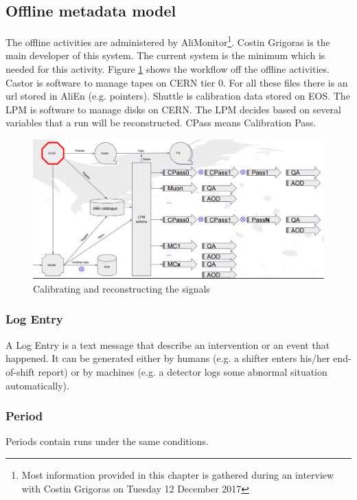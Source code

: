 \subsection{Offline metadata model}
The offline activities are administered by AliMonitor\footnote{Most information provided in this chapter is gathered during an interview with Costin Grigoras on Tuesday 12 December 2017}. Costin Grigoras is the main developer of this system. The current system is the minimum which is needed for this activity. Figure \ref{fig:offlineWorkflow} shows the workflow off the offline activities. Castor is software to manage tapes on CERN tier 0. For all these files there is an url stored in AliEn (e.g. pointers). Shuttle is calibration data stored on EOS. The LPM is software to manage disks on CERN. The LPM decides based on several variables that a run will be reconstructed. CPass means Calibration Pass. 

\begin{figure}[h]
  \begin{center}
    \includegraphics[scale=0.25]{./images/offline_workflow.png}
    \caption{Calibrating and reconstructing the signals}
    \label{fig:offlineWorkflow}
  \end{center}
\end{figure}


\subsubsection{Log Entry}
A Log Entry is a text message that describe an intervention or an event that happened. It can be generated either by humans (e.g. a shifter enters his/her end-of-shift report) or by machines (e.g. a detector logs some abnormal situation automatically). 

\subsubsection{Period}
Periods contain runs under the same conditions.

